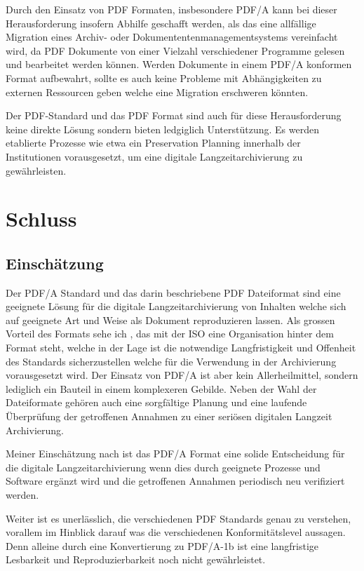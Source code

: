 \documentclass[a4paper,oneside, 12pt]{report}
\begin{document}
Durch den Einsatz von PDF Formaten, insbesondere PDF/A kann bei dieser Herausforderung insofern Abhilfe geschafft werden, als das eine allfällige Migration eines Archiv- oder Dokumententenmanagementsystems vereinfacht wird, da PDF Dokumente von einer Vielzahl verschiedener Programme gelesen und bearbeitet werden können. Werden Dokumente in einem PDF/A konformen Format aufbewahrt, sollte es auch keine Probleme mit Abhängigkeiten zu externen Ressourcen geben welche eine Migration erschweren könnten.

Der PDF-Standard und das PDF Format sind auch für diese Herausforderung keine direkte Lösung sondern bieten ledgiglich Unterstützung. Es werden etablierte Prozesse wie etwa ein Preservation Planning innerhalb der Institutionen vorausgesetzt, um eine digitale Langzeitarchivierung zu gewährleisten.


\chapter{Schluss}\label{sec:schluss}
\section{Einschätzung}
Der PDF/A Standard und das darin beschriebene PDF Dateiformat sind eine geeignete Lösung für die digitale Langzeitarchivierung von Inhalten welche sich auf geeignete Art und Weise als Dokument reproduzieren lassen. Als grossen Vorteil des Formats sehe ich , das mit der \ac{ISO} eine Organisation hinter dem Format steht, welche in der Lage ist die notwendige Langfristigkeit und Offenheit des Standards sicherzustellen welche für die Verwendung in der Archivierung vorausgesetzt wird. Der Einsatz von PDF/A ist aber kein Allerheilmittel, sondern lediglich ein Bauteil in einem komplexeren Gebilde. Neben der Wahl der Dateiformate gehören auch eine sorgfältige Planung und eine laufende Überprüfung der getroffenen Annahmen zu einer seriösen digitalen Langzeit Archivierung. 

Meiner Einschätzung nach ist das PDF/A Format eine solide Entscheidung für die digitale Langzeitarchivierung wenn dies durch geeignete Prozesse und Software ergänzt wird und die getroffenen Annahmen periodisch neu verifiziert werden. 

Weiter ist es unerlässlich, die verschiedenen PDF Standards genau zu verstehen, vorallem im Hinblick darauf was die verschiedenen Konformitätslevel aussagen. Denn alleine durch eine Konvertierung zu PDF/A-1b ist eine langfristige Lesbarkeit und Reproduzierbarkeit noch nicht gewährleistet.
\end{document}
